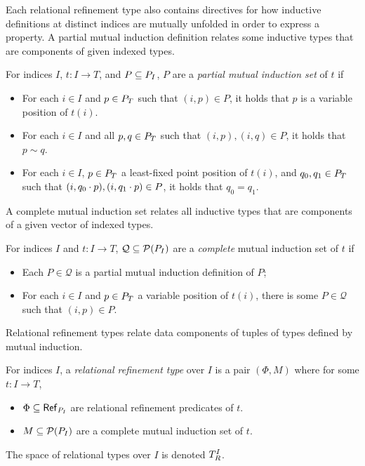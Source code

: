Each relational refinement type also contains directives for how
inductive definitions at distinct indices are mutually unfolded in
order to express a property.
%
A partial mutual induction definition relates some inductive types
that are components of given indexed types.
%
\begin{defn}
  \label{defn:part-mut-unfold}
  For indices $I$, $t : I \to T$, and $P \subseteq P_{I}$, $P$
  are a \emph{partial mutual induction set} of $t$ if
  \begin{itemize}
  \item %
    For each $i \in I$ and $p \in P_T$ such that $(i, p) \in P$, it
    holds that $p$ is a variable position of $t(i)$.
  \item %
    For each $i \in I$ and all $p, q \in P_T$ such that
    $(i, p), (i, q) \in P$, it holds that $p \sim q$.
  \item %
    For each $i \in I$, $p \in P_T$ a least-fixed point position of
    $t(i)$, and $q_0, q_1 \in P_T$ such that
    $(i, q_0 \cdot p), (i, q_1 \cdot p) \in P$, it holds that
    $q_0 = q_1$.
  \end{itemize}
\end{defn}

A complete mutual induction set relates all inductive types that are
components of a given vector of indexed types.
%
\begin{defn}
  \label{defn:compl-mut-unfold}
  For indices $I$ and $t : I \to T$,
  $\mathcal{Q} \subseteq \mathcal{P}(P_{I})$ are a \emph{complete}
  mutual induction set of $t$ if
  \begin{itemize}
  \item %
    Each $P \in \mathcal{Q}$ is a partial mutual induction definition
    of $P$;
  \item %
    For each $i \in I$ and $p \in P_T$ a variable position of
    $t(i)$, there is some $P \in \mathcal{Q}$ such that
    $(i, p) \in P$.
  \end{itemize}
\end{defn}

Relational refinement types relate data components of tuples of types
defined by mutual induction.
%
\begin{defn}
  \label{defn:rel-types}
  For indices $I$, a \emph{relational refinement type} over $I$ is a
  pair $(\Phi, M)$ where for some $t : I \to T$,
  \begin{itemize}
  \item %
    $\Phi \subseteq \mathsf{Ref}_{ P_{I} }$ are relational refinement
    predicates of $t$.
  \item %
    $M \subseteq \mathcal{P}( P_{I} )$ are a complete mutual induction
    set of $t$.
  \end{itemize}
\end{defn}
%
The space of relational types over $I$ is denoted $T_{R}^{I}$.

